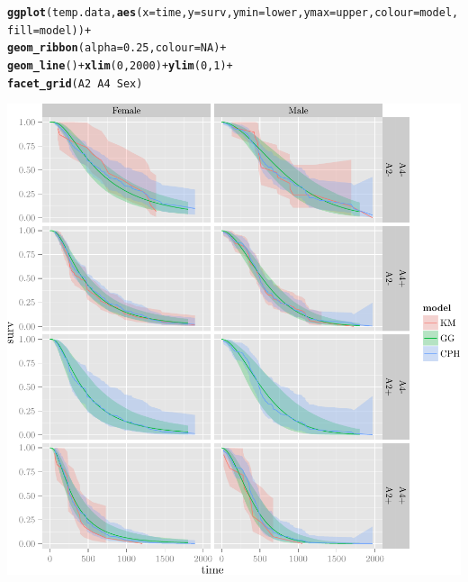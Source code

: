 \documentclass{article}\usepackage[]{graphicx}\usepackage[]{color}
\makeatletter
\def\maxwidth{ %
  \ifdim\Gin@nat@width>\linewidth
    \linewidth
  \else
    \Gin@nat@width
  \fi
}
\newcommand{\hlnum}[1]{\textcolor[rgb]{0.686,0.059,0.569}{#1}}%
\newcommand{\hlopt}[1]{\textcolor[rgb]{0,0,0}{#1}}%
\newcommand{\hlstd}[1]{\textcolor[rgb]{0.345,0.345,0.345}{#1}}%
\newcommand{\hlkwc}[1]{\textcolor[rgb]{0.333,0.667,0.333}{#1}}%
\newcommand{\hlkwd}[1]{\textcolor[rgb]{0.737,0.353,0.396}{\textbf{#1}}}%
\newenvironment{kframe}{%
 \def\at@end@of@kframe{}%
 \ifinner\ifhmode%
  \def\at@end@of@kframe{\end{minipage}}%
  \begin{minipage}{\columnwidth}%
 \fi\fi%
 \def\FrameCommand##1{\hskip\@totalleftmargin \hskip-\fboxsep
 \colorbox{shadecolor}{##1}\hskip-\fboxsep
     \hskip-\linewidth \hskip-\@totalleftmargin \hskip\columnwidth}%
 \MakeFramed {\advance\hsize-\width
   \@totalleftmargin\z@ \linewidth\hsize
   \@setminipage}}%
 {\par\unskip\endMakeFramed%
 \at@end@of@kframe}
\newenvironment{knitrout}{}{} %
\makeatother
\begin{document}
\begin{knitrout}
{}


\begin{kframe}\begin{alltt}
\hlkwd{ggplot}\hlstd{(temp.data,} \hlkwd{aes}\hlstd{(}\hlkwc{x} \hlstd{= time,} \hlkwc{y} \hlstd{= surv,} \hlkwc{ymin} \hlstd{= lower,} \hlkwc{ymax} \hlstd{= upper,} \hlkwc{colour} \hlstd{= model,} \hlkwc{fill} \hlstd{= model))} \hlopt{+}
        \hlkwd{geom_ribbon}\hlstd{(}\hlkwc{alpha} \hlstd{=} \hlnum{0.25}\hlstd{,} \hlkwc{colour} \hlstd{=} \hlnum{NA}\hlstd{)} \hlopt{+}
        \hlkwd{geom_line}\hlstd{()} \hlopt{+} \hlkwd{xlim}\hlstd{(}\hlnum{0}\hlstd{,} \hlnum{2000}\hlstd{)} \hlopt{+} \hlkwd{ylim}\hlstd{(}\hlnum{0}\hlstd{,} \hlnum{1}\hlstd{)} \hlopt{+}
        \hlkwd{facet_grid}\hlstd{(A2} \hlopt{~} \hlstd{A4} \hlopt{~} \hlstd{Sex)}
\end{alltt}


{\ttfamily\noindent\color{warningcolor}{\#\# Warning: Removed 3 rows containing missing values (geom\_path).}}

{\ttfamily\noindent\color{warningcolor}{\#\# Warning: Removed 3 rows containing missing values (geom\_path).}}

{\ttfamily\noindent\color{warningcolor}{\#\# Warning: Removed 2 rows containing missing values (geom\_path).}}

{\ttfamily\noindent\color{warningcolor}{\#\# Warning: Removed 2 rows containing missing values (geom\_path).}}\end{kframe}

{\centering \includegraphics[width=\maxwidth]{figure/05-final-fit-assessment-2} 

}



\end{knitrout}
\end{document}
